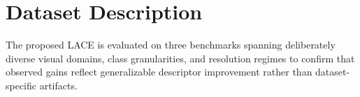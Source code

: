 \documentclass{bmvc2k}
\begin{document}

\section{Dataset Description}
The proposed LACE is evaluated on three benchmarks spanning deliberately diverse visual domains, class granularities, and resolution regimes to confirm that observed gains reflect generalizable descriptor improvement rather than dataset-specific artifacts.
\end{document}
